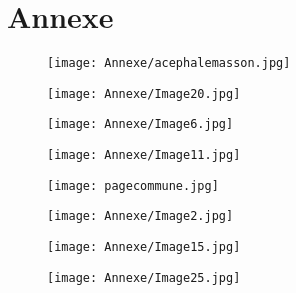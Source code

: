\chapter*{Annexe} 


 \begin{figure}[H]
   \centering
   \texttt{[image: Annexe/acephalemasson.jpg]}
	\caption{\cite{memoiremonde}}\label{fig:Acephale}
\end{figure}


  \begin{figure}[H]
   \centering
   \texttt{[image: Annexe/Image20.jpg]}
	\caption{\cite{journallimbour}}\label{fig:limbour2}
    \end{figure}

  \begin{figure}[H]
   \centering
   \texttt{[image: Annexe/Image6.jpg]}
	\caption{\cite{journallimbour}}\label{fig:journallimbour}
    \end{figure}

    \begin{figure}[H]
   \centering
   \texttt{[image: Annexe/Image11.jpg]}
	\caption{\cite{plafondodeon}}\label{fig:odeon}
    \end{figure}


  \begin{figure}[H]
   \centering
   \texttt{[image: pagecommune.jpg]}
	\caption{\cite{commune}}\label{fig:Massoncommune}
    \end{figure}



   \begin{figure}[H]
   \centering
   \texttt{[image: Annexe/Image2.jpg]}
	\caption{\cite{courbetcommunard}}\label{fig:commune}
    \end{figure}


  \begin{figure}[H]
   \centering
   \texttt{[image: Annexe/Image15.jpg]}
	\caption{\cite{courbetcommunard}}\label{fig:courbetcommune}
    \end{figure}


   \begin{figure}[H]
   \centering
   \texttt{[image: Annexe/Image25.jpg]}
	\caption{\cite{peindrefinjeu}}\label{fig:peindrefinjeu}
    \end{figure}


